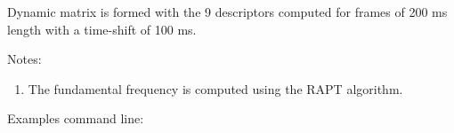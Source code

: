 \documentclass[letterpaper,10pt,english]{sphinxmanual}
\begin{document}
\begin{fulllineitems}
Dynamic matrix is formed with the 9 descriptors computed for frames of 200 ms length with a time-shift of 100 ms.

Notes:
\begin{enumerate}
\item {} 
The fundamental frequency is computed using the RAPT algorithm.

\end{enumerate}

\begin{sphinxVerbatim}[commandchars=\\\{\}]
              
\end{sphinxVerbatim}

Examples command line:


\end{fulllineitems}
\end{document}
